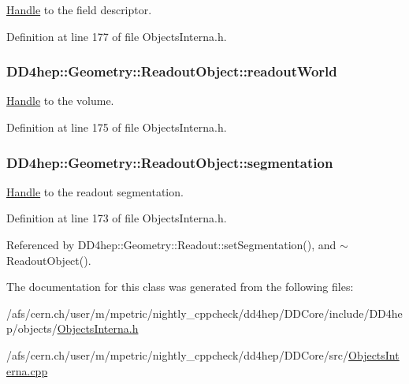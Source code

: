 \hyperlink{class_d_d4hep_1_1_handle}{Handle} to the field descriptor. 

Definition at line 177 of file ObjectsInterna.h.\hypertarget{class_d_d4hep_1_1_geometry_1_1_readout_object_ac4b6fc2857d2794caa59a544de8b2579}{
\subsubsection[{readoutWorld}]{ {\bf DD4hep::Geometry::ReadoutObject::readoutWorld}}}
\label{class_d_d4hep_1_1_geometry_1_1_readout_object_ac4b6fc2857d2794caa59a544de8b2579}


\hyperlink{class_d_d4hep_1_1_handle}{Handle} to the volume. 

Definition at line 175 of file ObjectsInterna.h.\hypertarget{class_d_d4hep_1_1_geometry_1_1_readout_object_ac9e7bca00d99bd317bdd942c9ab132d5}{
\subsubsection[{segmentation}]{ {\bf DD4hep::Geometry::ReadoutObject::segmentation}}}
\label{class_d_d4hep_1_1_geometry_1_1_readout_object_ac9e7bca00d99bd317bdd942c9ab132d5}


\hyperlink{class_d_d4hep_1_1_handle}{Handle} to the readout segmentation. 

Definition at line 173 of file ObjectsInterna.h.

Referenced by DD4hep::Geometry::Readout::setSegmentation(), and $\sim$ReadoutObject().

The documentation for this class was generated from the following files:\begin{DoxyCompactItemize}
\item 
/afs/cern.ch/user/m/mpetric/nightly\_\-cppcheck/dd4hep/DDCore/include/DD4hep/objects/\hyperlink{_objects_interna_8h}{ObjectsInterna.h}\item 
/afs/cern.ch/user/m/mpetric/nightly\_\-cppcheck/dd4hep/DDCore/src/\hyperlink{_objects_interna_8cpp}{ObjectsInterna.cpp}\end{DoxyCompactItemize}
